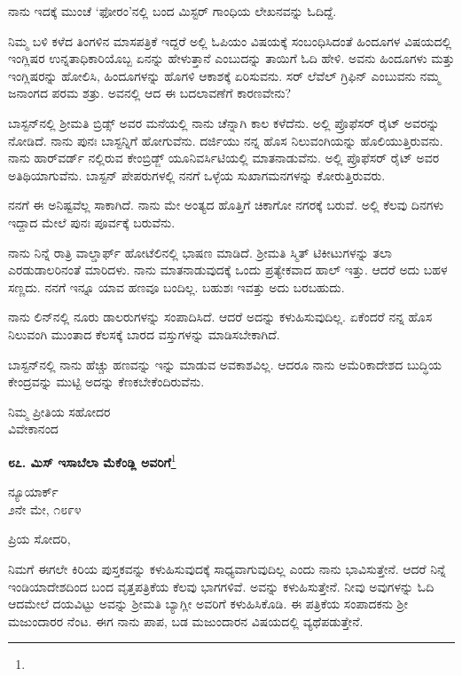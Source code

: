 ನಾನು ಇದಕ್ಕೆ ಮುಂಚೆ ‘ಫೋರಂ’ನಲ್ಲಿ ಬಂದ ಮಿಸ್ಟರ್ ಗಾಂಧಿಯ ಲೇಖನವನ್ನು ಓದಿದ್ದೆ.
\vspace{0.1cm}

ನಿಮ್ಮ ಬಳಿ ಕಳೆದ ತಿಂಗಳಿನ  ಮಾಸಪತ್ರಿಕೆ ಇದ್ದರೆ ಅಲ್ಲಿ ಓಪಿಯಂ ವಿಷಯಕ್ಕೆ ಸಂಬಂಧಿಸಿದಂತೆ ಹಿಂದೂಗಳ ವಿಷಯದಲ್ಲಿ ಇಂಗ್ಲಿಷರ ಉನ್ನತಾಧಿಕಾರಿಯೊಬ್ಬ ಏನನ್ನು ಹೇಳುತ್ತಾನೆ ಎಂಬುದನ್ನು ತಾಯಿಗೆ ಓದಿ ಹೇಳಿ. ಅವನು ಹಿಂದೂಗಳು ಮತ್ತು ಇಂಗ್ಲಿಷರನ್ನು ಹೋಲಿಸಿ, ಹಿಂದೂಗಳನ್ನು ಹೊಗಳಿ ಆಕಾಶಕ್ಕೆ ಏರಿಸುವನು. ಸರ್‌ ಲೆವೆಲ್ ಗ್ರಿಫಿನ್ ಎಂಬುವನು ನಮ್ಮ ಜನಾಂಗದ ಪರಮ ಶತ್ರು. ಅವನಲ್ಲಿ ಆದ ಈ ಬದಲಾವಣೆಗೆ ಕಾರಣವೇನು?
\vspace{0.1cm}

ಬಾಸ್ಟನ್‌ನಲ್ಲಿ ಶ‍್ರೀಮತಿ ಬ್ರಿಡ್ಸ್ ಅವರ ಮನೆಯಲ್ಲಿ ನಾನು ಚೆನ್ನಾಗಿ ಕಾಲ ಕಳೆದೆನು. ಅಲ್ಲಿ ಪ್ರೊಫೆಸರ್ ರೈಟ್ ಅವರನ್ನು ನೋಡಿದೆ. ನಾನು ಪುನಃ ಬಾಸ್ಟನ್ನಿಗೆ ಹೋಗುವೆನು. ದರ್ಜಿಯು ನನ್ನ ಹೊಸ ನಿಲುವಂಗಿಯನ್ನು ಹೊಲಿಯುತ್ತಿರುವನು. ನಾನು ಹಾರ್‌ವರ್ಡ್‌ ನಲ್ಲಿರುವ ಕೇಂಬ್ರಿಡ್ಜ್ ಯೂನಿವರ್ಸಿಟಿಯಲ್ಲಿ ಮಾತನಾಡುವೆನು. ಅಲ್ಲಿ ಪ್ರೊಫೆಸರ್ ರೈಟ್ ಅವರ ಅತಿಥಿಯಾಗುವೆನು. ಬಾಸ್ಟನ್ ಪೇಪರುಗಳಲ್ಲಿ ನನಗೆ ಒಳ್ಳೆಯ ಸುಖಾಗಮನಗಳನ್ನು ಕೋರುತ್ತಿರುವರು.

ನನಗೆ ಈ ಅನಿಷ್ಟವೆಲ್ಲ ಸಾಕಾಗಿದೆ. ನಾನು ಮೇ ಅಂತ್ಯದ ಹೊತ್ತಿಗೆ ಚಿಕಾಗೋ ನಗರಕ್ಕೆ ಬರುವೆ. ಅಲ್ಲಿ ಕೆಲವು ದಿನಗಳು ಇದ್ದಾದ ಮೇಲೆ ಪುನಃ ಪೂರ್ವಕ್ಕೆ ಬರುವೆನು.

ನಾನು ನಿನ್ನೆ ರಾತ್ರಿ ವಾಲ್ಡಾರ್ಫ್ ಹೋಟೆಲಿನಲ್ಲಿ ಭಾಷಣ ಮಾಡಿದೆ. ಶ‍್ರೀಮತಿ ಸ್ಮಿತ್ ಟಿಕೀಟುಗಳನ್ನು ತಲಾ ಎರಡುಡಾಲರಿನಂತೆ ಮಾರಿದಳು. ನಾನು ಮಾತನಾಡುವುದಕ್ಕೆ ಒಂದು ಪ್ರತ್ಯೇಕವಾದ ಹಾಲ್ ಇತ್ತು. ಆದರೆ ಅದು ಬಹಳ ಸಣ್ಣದು. ನನಗೆ ಇನ್ನೂ ಯಾವ ಹಣವೂ ಬಂದಿಲ್ಲ. ಬಹುಶಃ ಇವತ್ತು ಅದು ಬರಬಹುದು.

ನಾನು ಲಿನ್‌ನಲ್ಲಿ ನೂರು ಡಾಲರುಗಳನ್ನು ಸಂಪಾದಿಸಿದೆ. ಆದರೆ ಅದನ್ನು ಕಳುಹಿಸುವುದಿಲ್ಲ. ಏಕೆಂದರೆ ನನ್ನ ಹೊಸ ನಿಲುವಂಗಿ ಮುಂತಾದ ಕೆಲಸಕ್ಕೆ ಬಾರದ ವಸ್ತುಗಳನ್ನು ಮಾಡಿಸಬೇಕಾಗಿದೆ.

ಬಾಸ್ಟನ್‌ನಲ್ಲಿ ನಾನು ಹೆಚ್ಚು ಹಣವನ್ನು ಇನ್ನು ಮಾಡುವ ಅವಕಾಶವಿಲ್ಲ. ಆದರೂ ನಾನು ಅಮೆರಿಕಾದೇಶದ ಬುದ್ಧಿಯ ಕೇಂದ್ರವನ್ನು ಮುಟ್ಟಿ ಅದನ್ನು ಕೆಣಕಬೇಕೆಂದಿರುವೆನು.

{\flushright
ನಿಮ್ಮ ಪ್ರೀತಿಯ ಸಹೋದರ\\ವಿವೇಕಾನಂದ\par}

\begin{center}
\textbf{೮೭. ಮಿಸ್ ಇಸಾಬೆಲಾ ಮೆಕೆಂಡ್ಲಿ ಅವರಿಗೆ}\footnote{}
\end{center}

\begin{flushright}
ನ್ಯೂಯಾರ್ಕ್\\೨ನೇ ಮೇ, ೧೮೯೪
\end{flushright}

\noindent
ಪ್ರಿಯ ಸೋದರಿ,

ನಿಮಗೆ ಈಗಲೇ ಕಿರಿಯ ಪುಸ್ತಕವನ್ನು ಕಳುಹಿಸುವುದಕ್ಕೆ ಸಾಧ್ಯವಾಗುವುದಿಲ್ಲ ಎಂದು ನಾನು ಭಾವಿಸುತ್ತೇನೆ. ಆದರೆ ನಿನ್ನೆ ಇಂಡಿಯಾದೇಶದಿಂದ ಬಂದ ವೃತ್ತಪತ್ರಿಕೆಯ ಕೆಲವು ಭಾಗಗಳಿವೆ. ಅವನ್ನು ಕಳುಹಿಸುತ್ತೇನೆ. ನೀವು ಅವುಗಳನ್ನು ಓದಿ ಆದಮೇಲೆ ದಯವಿಟ್ಟು ಅವನ್ನು ಶ‍್ರೀಮತಿ ಬ್ಯಾಗ್ಲೀ ಅವರಿಗೆ ಕಳುಹಿಸಿಕೊಡಿ. ಈ ಪತ್ರಿಕೆಯ ಸಂಪಾದಕನು ಶ‍್ರೀ ಮಜುಂದಾರರ ನೆಂಟ. ಈಗ ನಾನು ಪಾಪ, ಬಡ ಮಜುಂದಾರನ ವಿಷಯದಲ್ಲಿ ವ್ಯಥೆಪಡುತ್ತೇನೆ.

